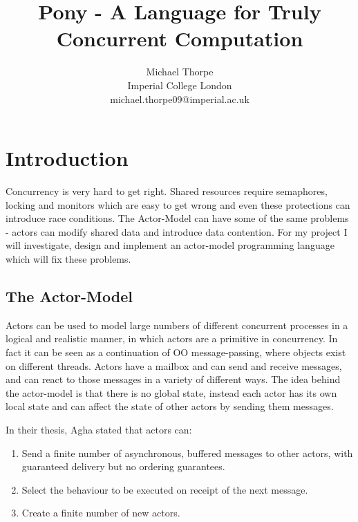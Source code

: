 \documentclass{article}
\begin{document}
\title{Pony - A Language for Truly Concurrent Computation}

\author{ 	Michael Thorpe\\
		Imperial College London\\
		michael.thorpe09@imperial.ac.uk}
\maketitle
\tableofcontents

\section{Introduction}

Concurrency is very hard to get right. Shared resources require
semaphores, locking and monitors which are easy to get wrong
and even these protections can introduce race conditions.
The Actor-Model can have some of the same problems - actors
can modify shared data and introduce data contention.
For my project I will investigate, design and implement an actor-model
programming language which will fix these problems.

\subsection{The Actor-Model}

Actors can be used to model large numbers of different concurrent processes in a
logical and realistic manner, in which actors are a primitive in concurrency. In
fact it can be seen as a continuation of OO message-passing, where objects exist
on different threads. Actors have a mailbox and can send and receive messages,
and can react to those messages in a variety of different ways. The idea behind
the actor-model is that there is no global state, instead each actor has its own
local state and can affect the state of other actors by sending them messages.

In their thesis, Agha\cite{agha1985} stated that actors can:
\begin{enumerate}
\item Send a finite number of asynchronous, buffered messages to other actors,
with guaranteed delivery but no ordering guarantees.
\item Select the behaviour to be executed on receipt of the next message.
\item Create a finite number of new actors.
\end{enumerate}
\end{document}
